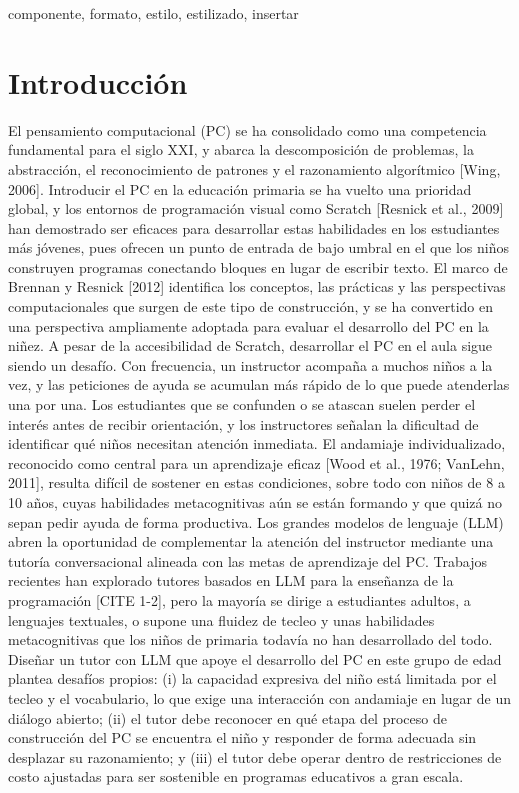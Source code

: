 \documentclass[conference]{IEEEtran}
\begin{document}
\begin{IEEEkeywords}
componente, formato, estilo, estilizado, insertar
\end{IEEEkeywords}

\section{Introducción}
El pensamiento computacional (PC) se ha consolidado como una competencia fundamental para el siglo XXI, y abarca la descomposición de problemas, la abstracción, el reconocimiento de patrones y el razonamiento algorítmico [Wing, 2006]. Introducir el PC en la educación primaria se ha vuelto una prioridad global, y los entornos de programación visual como Scratch [Resnick et al., 2009] han demostrado ser eficaces para desarrollar estas habilidades en los estudiantes más jóvenes, pues ofrecen un punto de entrada de bajo umbral en el que los niños construyen programas conectando bloques en lugar de escribir texto. El marco de Brennan y Resnick [2012] identifica los conceptos, las prácticas y las perspectivas computacionales que surgen de este tipo de construcción, y se ha convertido en una perspectiva ampliamente adoptada para evaluar el desarrollo del PC en la niñez.
A pesar de la accesibilidad de Scratch, desarrollar el PC en el aula sigue siendo un desafío. Con frecuencia, un instructor acompaña a muchos niños a la vez, y las peticiones de ayuda se acumulan más rápido de lo que puede atenderlas una por una. Los estudiantes que se confunden o se atascan suelen perder el interés antes de recibir orientación, y los instructores señalan la dificultad de identificar qué niños necesitan atención inmediata. El andamiaje individualizado, reconocido como central para un aprendizaje eficaz [Wood et al., 1976; VanLehn, 2011], resulta difícil de sostener en estas condiciones, sobre todo con niños de 8 a 10 años, cuyas habilidades metacognitivas aún se están formando y que quizá no sepan pedir ayuda de forma productiva.
Los grandes modelos de lenguaje (LLM) abren la oportunidad de complementar la atención del instructor mediante una tutoría conversacional alineada con las metas de aprendizaje del PC. Trabajos recientes han explorado tutores basados en LLM para la enseñanza de la programación [CITE 1-2], pero la mayoría se dirige a estudiantes adultos, a lenguajes textuales, o supone una fluidez de tecleo y unas habilidades metacognitivas que los niños de primaria todavía no han desarrollado del todo. Diseñar un tutor con LLM que apoye el desarrollo del PC en este grupo de edad plantea desafíos propios: (i) la capacidad expresiva del niño está limitada por el tecleo y el vocabulario, lo que exige una interacción con andamiaje en lugar de un diálogo abierto; (ii) el tutor debe reconocer en qué etapa del proceso de construcción del PC se encuentra el niño y responder de forma adecuada sin desplazar su razonamiento; y (iii) el tutor debe operar dentro de restricciones de costo ajustadas para ser sostenible en programas educativos a gran escala.
\end{document}
